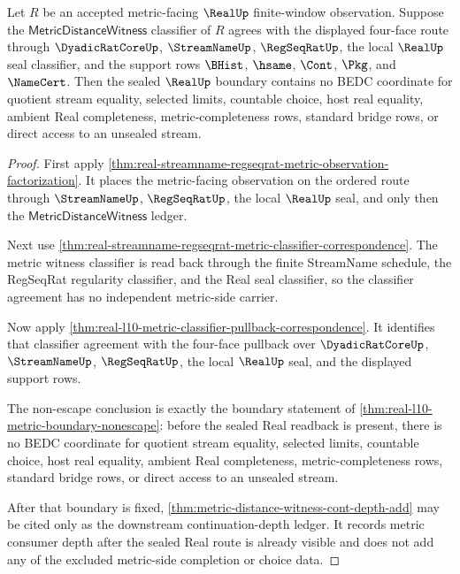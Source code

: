 \begin{theorem}
\label{thm:real-l10-metric-preseal-nonescape}
Let $R$ be an accepted metric-facing $\RealUp$ finite-window observation. Suppose
the $\mathsf{MetricDistanceWitness}$ classifier of $R$ agrees with the displayed
four-face route through $\DyadicRatCoreUp$, $\StreamNameUp$, $\RegSeqRatUp$, the
local $\RealUp$ seal classifier, and the support rows $\BHist$, $\hsame$,
$\Cont$, $\Pkg$, and $\NameCert$. Then the sealed $\RealUp$ boundary contains no
BEDC coordinate for quotient stream equality, selected limits, countable choice,
host real equality, ambient Real completeness, metric-completeness rows,
standard bridge rows, or direct access to an unsealed stream.
\end{theorem}
\begin{proof}
First apply
\autoref{thm:real-streamname-regseqrat-metric-observation-factorization}. It
places the metric-facing observation on the ordered route through
$\StreamNameUp$, $\RegSeqRatUp$, the local $\RealUp$ seal, and only then the
$\mathsf{MetricDistanceWitness}$ ledger.

Next use
\autoref{thm:real-streamname-regseqrat-metric-classifier-correspondence}. The
metric witness classifier is read back through the finite StreamName schedule,
the RegSeqRat regularity classifier, and the Real seal classifier, so the
classifier agreement has no independent metric-side carrier.

Now apply
\autoref{thm:real-l10-metric-classifier-pullback-correspondence}. It identifies
that classifier agreement with the four-face pullback over
$\DyadicRatCoreUp$, $\StreamNameUp$, $\RegSeqRatUp$, the local $\RealUp$ seal,
and the displayed support rows.

The non-escape conclusion is exactly the boundary statement of
\autoref{thm:real-l10-metric-boundary-nonescape}: before the sealed Real
readback is present, there is no BEDC coordinate for quotient stream equality,
selected limits, countable choice, host real equality, ambient Real
completeness, metric-completeness rows, standard bridge rows, or direct access
to an unsealed stream.

After that boundary is fixed,
\autoref{thm:metric-distance-witness-cont-depth-add} may be cited only as the
downstream continuation-depth ledger. It records metric consumer depth after the
sealed Real route is already visible and does not add any of the excluded
metric-side completion or choice data.
\end{proof}

